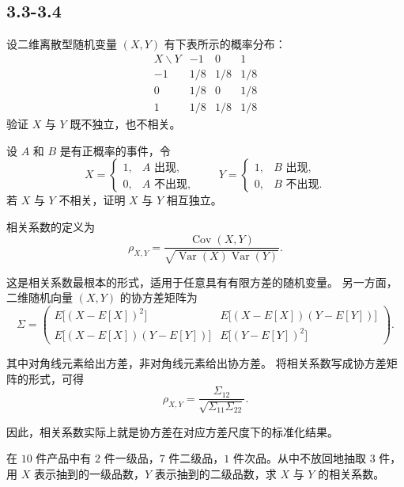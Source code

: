 \subsection*{3.3-3.4}
\begin{homework}[3.25]
设二维离散型随机变量 $(X,Y)$ 有下表所示的概率分布：
\[
\begin{array}{c|ccc}
  X \backslash Y & -1 & 0 & 1 \\ \hline
  -1 & 1/8 & 1/8 & 1/8 \\
   0 & 1/8 & 0   & 1/8 \\
   1 & 1/8 & 1/8 & 1/8
\end{array}
\]
验证 $X$ 与 $Y$ 既不独立，也不相关。
\end{homework}

\begin{homework}[3.26]
设 $A$ 和 $B$ 是有正概率的事件，令
\[
X=
\begin{cases}
1, & A\text{ 出现},\\
0, & A\text{ 不出现},
\end{cases}
\qquad
Y=
\begin{cases}
1, & B\text{ 出现},\\
0, & B\text{ 不出现}.
\end{cases}
\]
若 $X$ 与 $Y$ 不相关，证明 $X$ 与 $Y$ 相互独立。
\end{homework}
\begin{definition}[相关系数与协方差矩阵]
相关系数的定义为
\[
\rho_{X,Y}
=\frac{\operatorname{Cov}(X,Y)}
{\sqrt{\operatorname{Var}(X)\operatorname{Var}(Y)}}.
\]

这是相关系数最根本的形式，适用于任意具有有限方差的随机变量。
另一方面，二维随机向量 $(X,Y)$ 的协方差矩阵为
\[
\Sigma=
\begin{pmatrix}
E\!\big[(X-E[X])^2\big] & E\!\big[(X-E[X])(Y-E[Y])\big] \\
E\!\big[(X-E[X])(Y-E[Y])\big] & E\!\big[(Y-E[Y])^2\big]
\end{pmatrix}.
\]

其中对角线元素给出方差，非对角线元素给出协方差。
将相关系数写成协方差矩阵的形式，可得
\[
\rho_{X,Y}
=\frac{\Sigma_{12}}{\sqrt{\Sigma_{11}\Sigma_{22}}}.
\]

因此，相关系数实际上就是协方差在对应方差尺度下的标准化结果。
\end{definition}
\begin{homework}[3.28]
在 $10$ 件产品中有 $2$ 件一级品，$7$ 件二级品，$1$ 件次品。从中不放回地抽取 $3$ 件，
用 $X$ 表示抽到的一级品数，$Y$ 表示抽到的二级品数，求 $X$ 与 $Y$ 的相关系数。
\end{homework}

